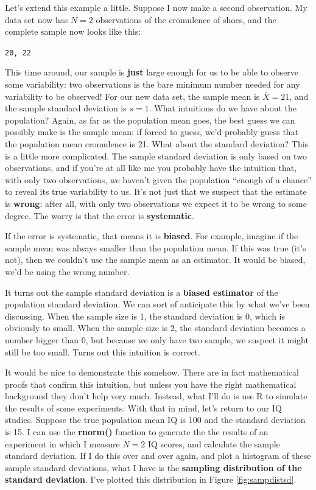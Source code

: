 \documentclass[
]{book}
\begin{document}
Let's extend this example a little. Suppose I now make a second observation. My data set now has \(N=2\) observations of the cromulence of shoes, and the complete sample now looks like this:

\texttt{20,\ 22}

This time around, our sample is \textbf{just} large enough for us to be able to observe some variability: two observations is the bare minimum number needed for any variability to be observed! For our new data set, the sample mean is \(\bar{X}=21\), and the sample standard deviation is \(s=1\). What intuitions do we have about the population? Again, as far as the population mean goes, the best guess we can possibly make is the sample mean: if forced to guess, we'd probably guess that the population mean cromulence is 21. What about the standard deviation? This is a little more complicated. The sample standard deviation is only based on two observations, and if you're at all like me you probably have the intuition that, with only two observations, we haven't given the population ``enough of a chance'' to reveal its true variability to us. It's not just that we suspect that the estimate is \textbf{wrong}: after all, with only two observations we expect it to be wrong to some degree. The worry is that the error is \textbf{systematic}.

If the error is systematic, that means it is \textbf{biased}. For example, imagine if the sample mean was always smaller than the population mean. If this was true (it's not), then we couldn't use the sample mean as an estimator. It would be biased, we'd be using the wrong number.

It turns out the sample standard deviation is a \textbf{biased estimator} of the population standard deviation. We can sort of anticipate this by what we've been discussing. When the sample size is 1, the standard deviation is 0, which is obviously to small. When the sample size is 2, the standard deviation becomes a number bigger than 0, but because we only have two sample, we suspect it might still be too small. Turns out this intuition is correct.

It would be nice to demonstrate this somehow. There are in fact mathematical proofs that confirm this intuition, but unless you have the right mathematical background they don't help very much. Instead, what I'll do is use R to simulate the results of some experiments. With that in mind, let's return to our IQ studies. Suppose the true population mean IQ is 100 and the standard deviation is 15. I can use the \textbf{rnorm()} function to generate the the results of an experiment in which I measure \(N=2\) IQ scores, and calculate the sample standard deviation. If I do this over and over again, and plot a histogram of these sample standard deviations, what I have is the \textbf{sampling distribution of the standard deviation}. I've plotted this distribution in Figure \ref{fig:sampdistsd}.
\end{document}
